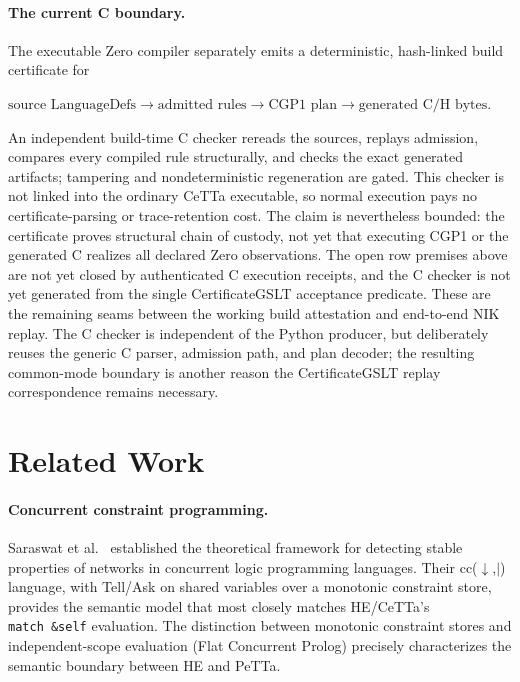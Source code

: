 \documentclass[11pt]{article}
\newcommand{\code}[1]{\texttt{#1}}
\newcommand{\PeTTa}{\textup{PeTTa}}
\newcommand{\HE}{\textup{HE}}
\newcommand{\CeTTa}{\textup{CeTTa}}
\begin{document}
\paragraph{The current C boundary.}
The executable Zero compiler separately emits a deterministic, hash-linked
build certificate for

\begin{center}
$\text{source LanguageDefs}\longrightarrow
  \text{admitted rules}\longrightarrow
  \text{CGP1 plan}\longrightarrow
  \text{generated C/H bytes}$.
\end{center}

\noindent
An independent build-time C checker rereads the sources, replays admission,
compares every compiled rule structurally, and checks the exact generated
artifacts; tampering and nondeterministic regeneration are gated.  This
checker is not linked into the ordinary \CeTTa{} executable, so normal
execution pays no certificate-parsing or trace-retention cost.  The claim is
nevertheless bounded: the certificate proves structural chain of custody,
not yet that executing CGP1 or the generated C realizes all declared Zero
observations.  The open row premises above are not yet closed by
authenticated C execution receipts, and the C checker is not yet generated
from the single CertificateGSLT acceptance predicate.  These are the remaining
seams between the working build attestation and end-to-end NIK replay.  The
C checker is independent of the Python producer, but deliberately reuses the
generic C parser, admission path, and plan decoder; the resulting common-mode
boundary is another reason the CertificateGSLT replay correspondence remains
necessary.

\section{Related Work}
\label{sec:related}

\paragraph{Concurrent constraint programming.}
Saraswat et al.~\cite{saraswat1988} established the theoretical
framework for detecting stable properties of networks in concurrent
logic programming languages.  Their cc($\downarrow$,$|$) language,
with Tell/Ask on shared variables over a monotonic constraint store,
provides the semantic model that most closely matches \HE{}/\CeTTa{}'s
\code{match~\&self} evaluation.  The distinction between monotonic
constraint stores and independent-scope evaluation (Flat Concurrent
Prolog) precisely characterizes the semantic boundary between \HE{} and
\PeTTa{}.
\end{document}
